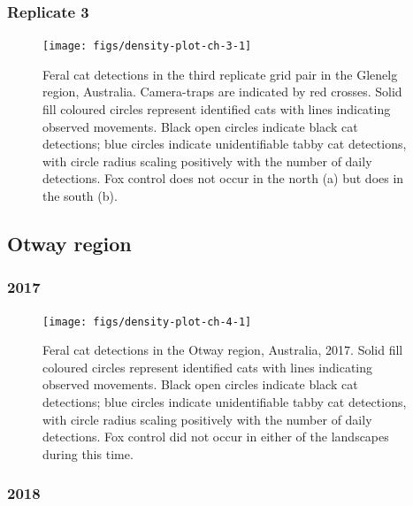 \documentclass[]{elsarticle} %
\begin{document}
\hypertarget{replicate-3}{%
\subsubsection{Replicate 3}\label{replicate-3}}

\begin{figure}

{\centering \texttt{[image: figs/density-plot-ch-3-1]} 

}

\caption{Feral cat detections in the third replicate grid pair in the Glenelg region, Australia. Camera-traps are indicated by red crosses. Solid fill coloured circles represent identified cats with lines indicating observed movements. Black open circles indicate black cat detections; blue circles indicate unidentifiable tabby cat detections, with circle radius scaling positively with the number of daily detections. Fox control does not occur in the north (a) but does in the south (b).}\label{fig:density-plot-ch-3}
\end{figure}

\newpage

\hypertarget{otway-region}{%
\subsection{Otway region}\label{otway-region}}

\hypertarget{section}{%
\subsubsection{2017}\label{section}}

\begin{figure}

{\centering \texttt{[image: figs/density-plot-ch-4-1]} 

}

\caption{Feral cat detections in the Otway region, Australia, 2017. Solid fill coloured circles represent identified cats with lines indicating observed movements. Black open circles indicate black cat detections; blue circles indicate unidentifiable tabby cat detections, with circle radius scaling positively with the number of daily detections. Fox control did not occur in either of the landscapes during this time.}\label{fig:density-plot-ch-4}
\end{figure}

\newpage

\hypertarget{section-1}{%
\subsubsection{2018}\label{section-1}}
\end{document}
